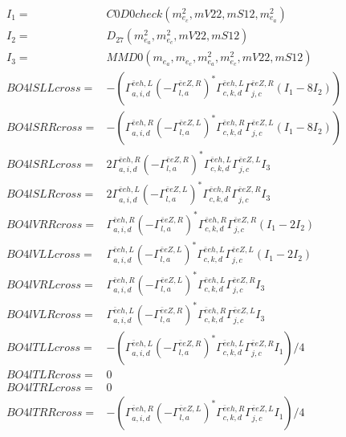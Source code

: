 \documentclass[A4,landscape]{article}
\begin{document}
\begin{align} 
I_1 = & C0D0check(m^2_{e_{{c}}}, mV22, mS12, m^2_{e_{{a}}}) \\ 
I_2 = & D_{27}(m^2_{e_{{a}}}, m^2_{e_{{c}}}, mV22, mS12) \\ 
I_3 = & MMD0(m_{e_{{a}}}, m_{e_{{c}}}, m^2_{e_{{a}}}, m^2_{e_{{c}}}, mV22, mS12) \\ 
  BO4lSLLcross= & -( \Gamma^{\bar{e}e h ,L}_{a, i, d} (- \Gamma^{\bar{e}e Z ,R} _{l, a})^* \Gamma^{\bar{e}e h ,L}_{c, k, d} \Gamma^{\bar{e}e Z ,R}_{j, c} (I_1 - 8 I_2)) \\ 
  BO4lSRRcross= & -( \Gamma^{\bar{e}e h ,R}_{a, i, d} (- \Gamma^{\bar{e}e Z ,L} _{l, a})^* \Gamma^{\bar{e}e h ,R}_{c, k, d} \Gamma^{\bar{e}e Z ,L}_{j, c} (I_1 - 8 I_2)) \\ 
  BO4lSRLcross= & 2  \Gamma^{\bar{e}e h ,R}_{a, i, d} (- \Gamma^{\bar{e}e Z ,R} _{l, a})^* \Gamma^{\bar{e}e h ,L}_{c, k, d} \Gamma^{\bar{e}e Z ,L}_{j, c} I_3 \\ 
  BO4lSLRcross= & 2  \Gamma^{\bar{e}e h ,L}_{a, i, d} (- \Gamma^{\bar{e}e Z ,L} _{l, a})^* \Gamma^{\bar{e}e h ,R}_{c, k, d} \Gamma^{\bar{e}e Z ,R}_{j, c} I_3 \\ 
  BO4lVRRcross= &  \Gamma^{\bar{e}e h ,R}_{a, i, d} (- \Gamma^{\bar{e}e Z ,R} _{l, a})^* \Gamma^{\bar{e}e h ,R}_{c, k, d} \Gamma^{\bar{e}e Z ,R}_{j, c} (I_1 - 2 I_2) \\ 
  BO4lVLLcross= &  \Gamma^{\bar{e}e h ,L}_{a, i, d} (- \Gamma^{\bar{e}e Z ,L} _{l, a})^* \Gamma^{\bar{e}e h ,L}_{c, k, d} \Gamma^{\bar{e}e Z ,L}_{j, c} (I_1 - 2 I_2) \\ 
  BO4lVRLcross= &  \Gamma^{\bar{e}e h ,R}_{a, i, d} (- \Gamma^{\bar{e}e Z ,L} _{l, a})^* \Gamma^{\bar{e}e h ,L}_{c, k, d} \Gamma^{\bar{e}e Z ,R}_{j, c} I_3 \\ 
  BO4lVLRcross= &  \Gamma^{\bar{e}e h ,L}_{a, i, d} (- \Gamma^{\bar{e}e Z ,R} _{l, a})^* \Gamma^{\bar{e}e h ,R}_{c, k, d} \Gamma^{\bar{e}e Z ,L}_{j, c} I_3 \\ 
  BO4lTLLcross= & -( \Gamma^{\bar{e}e h ,L}_{a, i, d} (- \Gamma^{\bar{e}e Z ,R} _{l, a})^* \Gamma^{\bar{e}e h ,L}_{c, k, d} \Gamma^{\bar{e}e Z ,R}_{j, c} I_1)/4 \\ 
  BO4lTLRcross= & 0 \\ 
  BO4lTRLcross= & 0 \\ 
  BO4lTRRcross= & -( \Gamma^{\bar{e}e h ,R}_{a, i, d} (- \Gamma^{\bar{e}e Z ,L} _{l, a})^* \Gamma^{\bar{e}e h ,R}_{c, k, d} \Gamma^{\bar{e}e Z ,L}_{j, c} I_1)/4 \\ 
\end{align} 
\end{document}
